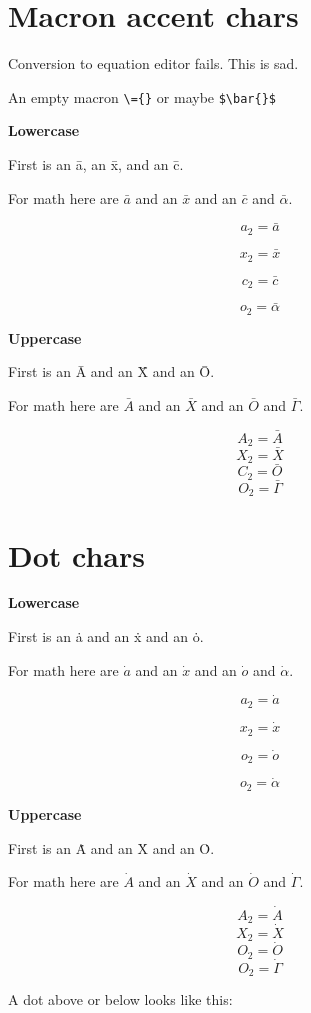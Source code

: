 \documentclass{article}
\begin{document}
\section{Macron accent chars}

Conversion to equation editor fails.  This is sad.

An empty macron \verb!\={}! or maybe \verb!$\bar{}$!

\textbf{Lowercase}

First is an \={a}, an \={x}, and an \={c}.

For math here are $\bar{a}$ and an $\bar{x}$ and an $\bar{c}$ and $\bar{\alpha}$.

$$a_2=\bar{a}$$

$$x_2=\bar{x}$$

$$c_2=\bar{c}$$

$$o_2=\bar{\alpha}$$

\textbf{Uppercase}

First is an \={A} and an \={X} and an \={O}.

For math here are $\bar{A}$ and an $\bar{X}$ and an $\bar{O}$ and $\bar{\Gamma}$.

$$A_2=\bar{A}$$
$$X_2=\bar{X}$$
$$C_2=\bar{O}$$
$$O_2=\bar{\Gamma}$$


\section{Dot chars}
\textbf{Lowercase}

First is an \.{a} and an \.{x} and an \.{o}.

For math here are $\dot{a}$ and an $\dot{x}$ and an $\dot{o}$ and $\dot{\alpha}$.

$$a_2=\dot{a}$$

$$x_2=\dot{x}$$

$$o_2=\dot{o}$$

$$o_2=\dot{\alpha}$$


\textbf{Uppercase}

First is an \.{A} and an \.{X} and an \.{O}.

For math here are $\dot{A}$ and an $\dot{X}$ and an $\dot{O}$ and $\dot{\Gamma}$.

$$A_2=\dot{A}$$
$$X_2=\dot{X}$$
$$O_2=\dot{O}$$
$$O_2=\dot{\Gamma}$$

A dot above or below looks like this:\\
\end{document}
